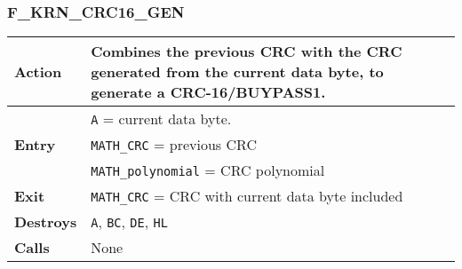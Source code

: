     \subsubsection{F\_KRN\_CRC16\_GEN}
    \label{func:fkrncrc16gen}
    \begin{tabular}{l p{15cm}}
        \hline\textbf{Action}
        & Combines the previous CRC with the CRC generated from the current
        data byte, to generate a CRC-16/BUYPASS1.\\
        \hline\multirow[t]{3}{4em}{\textbf{Entry}}
        & \texttt{A} = current data byte.\\
        & \texttt{MATH\_CRC} = previous CRC\\
        & \texttt{MATH\_polynomial} = CRC polynomial\\
        \hline\textbf{Exit}
        & \texttt{MATH\_CRC} = CRC with current data byte included\\
        \hline\textbf{Destroys} & \texttt{A}, \texttt{BC}, \texttt{DE}, \texttt{HL} \\
        \hline\textbf{Calls} & None\\
        \hline
    \end{tabular}
